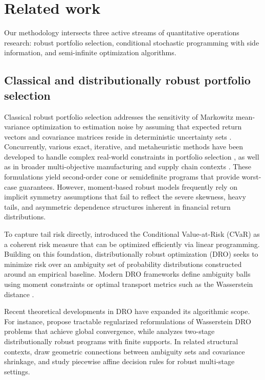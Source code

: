 \documentclass[smallextended]{svjour3}
\begin{document}
\section{Related work}\label{sec:related}
Our methodology intersects three active streams of quantitative operations research: robust portfolio selection, conditional stochastic programming with side information, and semi-infinite optimization algorithms.

\subsection{Classical and distributionally robust portfolio selection}
Classical robust portfolio selection addresses the sensitivity of Markowitz mean-variance optimization to estimation noise by assuming that expected return vectors and covariance matrices reside in deterministic uncertainty sets \cite{goldfarb2003robust, fabozzi2007robust}. Concurrently, various exact, iterative, and metaheuristic methods have been developed to handle complex real-world constraints in portfolio selection \cite{bezoui2019iterative, regaigui2025memetic}, as well as in broader multi-objective manufacturing and supply chain contexts \cite{bezoui2024hybrid}. These formulations yield second-order cone or semidefinite programs that provide worst-case guarantees. However, moment-based robust models frequently rely on implicit symmetry assumptions that fail to reflect the severe skewness, heavy tails, and asymmetric dependence structures inherent in financial return distributions.

To capture tail risk directly, \cite{rockafellar2000optimization, rockafellar2002conditional} introduced the Conditional Value-at-Risk (CVaR) as a coherent risk measure that can be optimized efficiently via linear programming. Building on this foundation, distributionally robust optimization (DRO) seeks to minimize risk over an ambiguity set of probability distributions constructed around an empirical baseline. Modern DRO frameworks define ambiguity balls using moment constraints \cite{delage2010distributionally} or optimal transport metrics such as the Wasserstein distance \cite{esfahani2018data}.

Recent theoretical developments in DRO have expanded its algorithmic scope. For instance, \cite{chu2025wasserstein} propose tractable regularized reformulations of Wasserstein DRO problems that achieve global convergence, while \cite{agra2025two} analyzes two-stage distributionally robust programs with finite supports. In related structural contexts, \cite{yue2026geometric} draw geometric connections between ambiguity sets and covariance shrinkage, and \cite{thoma2026piecewise} study piecewise affine decision rules for robust multi-stage settings.
\end{document}

